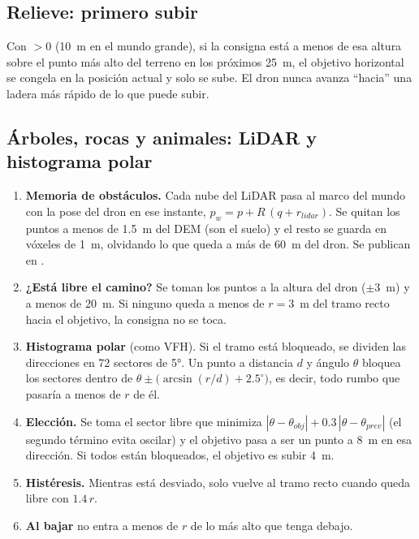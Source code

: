 \subsection{Relieve: primero subir}

Con  $> 0$ (10~m en el mundo grande), si la consigna está a menos de esa
altura sobre el punto más alto del terreno en los próximos 25~m, el objetivo horizontal se congela
en la posición actual y solo se sube. El dron nunca avanza ``hacia'' una ladera más rápido de lo
que puede subir.

\subsection{Árboles, rocas y animales: LiDAR y histograma polar}

\begin{enumerate}
  \item \textbf{Memoria de obstáculos.} Cada nube del LiDAR pasa al marco del mundo con la pose del
        dron en ese instante, $p_w = p + R\,(q + r_{lidar})$. Se quitan los puntos a menos de 1.5~m
        del DEM (son el suelo) y el resto se guarda en vóxeles de 1~m, olvidando lo que queda a más
        de 60~m del dron. Se publican en .
  \item \textbf{¿Está libre el camino?} Se toman los puntos a la altura del dron ($\pm3$~m) y a menos
        de 20~m. Si ninguno queda a menos de $r = 3$~m del tramo recto hacia el objetivo, la consigna
        no se toca.
  \item \textbf{Histograma polar} (como VFH). Si el tramo está bloqueado, se dividen las direcciones
        en 72 sectores de 5°. Un punto a distancia $d$ y ángulo $\theta$ bloquea los sectores dentro de
        $\theta\pm\big(\arcsin(r/d) + 2.5^\circ\big)$, es decir, todo rumbo que pasaría a menos de $r$ de él.
  \item \textbf{Elección.} Se toma el sector libre que minimiza
        $|\theta - \theta_{obj}| + 0.3\,|\theta - \theta_{prev}|$ (el segundo término evita
        oscilar) y el objetivo pasa a ser un punto a 8~m en esa dirección. Si todos están bloqueados,
        el objetivo es subir 4~m.
  \item \textbf{Histéresis.} Mientras está desviado, solo vuelve al tramo recto cuando queda libre con
        $1.4\,r$.
  \item \textbf{Al bajar} no entra a menos de $r$ de lo más alto que tenga debajo.
\end{enumerate}

